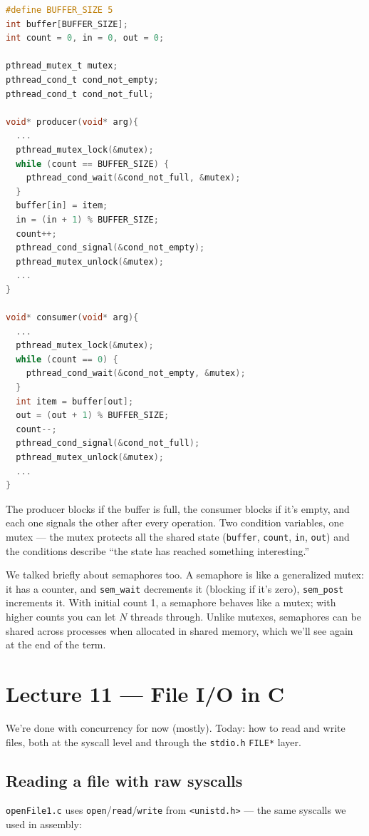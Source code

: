 \documentclass[11pt]{article}
\begin{document}
\begin{lstlisting}[language=C]
#define BUFFER_SIZE 5
int buffer[BUFFER_SIZE];
int count = 0, in = 0, out = 0;

pthread_mutex_t mutex;
pthread_cond_t cond_not_empty;
pthread_cond_t cond_not_full;

void* producer(void* arg){
  ...
  pthread_mutex_lock(&mutex);
  while (count == BUFFER_SIZE) {
    pthread_cond_wait(&cond_not_full, &mutex);
  }
  buffer[in] = item;
  in = (in + 1) % BUFFER_SIZE;
  count++;
  pthread_cond_signal(&cond_not_empty);
  pthread_mutex_unlock(&mutex);
  ...
}

void* consumer(void* arg){
  ...
  pthread_mutex_lock(&mutex);
  while (count == 0) {
    pthread_cond_wait(&cond_not_empty, &mutex);
  }
  int item = buffer[out];
  out = (out + 1) % BUFFER_SIZE;
  count--;
  pthread_cond_signal(&cond_not_full);
  pthread_mutex_unlock(&mutex);
  ...
}
\end{lstlisting}

The producer blocks if the buffer is full, the consumer blocks if
it's empty, and each one signals the other after every operation.
Two condition variables, one mutex --- the mutex protects all the
shared state (\texttt{buffer}, \texttt{count}, \texttt{in},
\texttt{out}) and the conditions describe ``the state has reached
something interesting.''

We talked briefly about semaphores too. A semaphore is like a
generalized mutex: it has a counter, and \texttt{sem\_wait}
decrements it (blocking if it's zero), \texttt{sem\_post}
increments it. With initial count 1, a semaphore behaves like a
mutex; with higher counts you can let $N$ threads through. Unlike
mutexes, semaphores can be shared across processes when allocated
in shared memory, which we'll see again at the end of the term.

\section{Lecture 11 --- File I/O in C}

We're done with concurrency for now (mostly). Today: how to read
and write files, both at the syscall level and through the
\texttt{stdio.h} \texttt{FILE*} layer.

\subsection*{Reading a file with raw syscalls}

\texttt{openFile1.c} uses \texttt{open}/\texttt{read}/\texttt{write}
from \texttt{<unistd.h>} --- the same syscalls we used in assembly:
\end{document}
